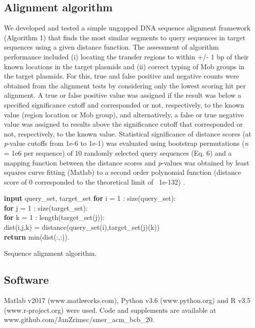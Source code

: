 \documentclass[sigconf]{acmart}
\begin{document}
\subsection{Alignment algorithm}
We developed and tested a simple ungapped DNA sequence alignment framework (Algorithm 1) that finds the most similar segments to query sequences in target sequences using a given distance function. The assessment of algorithm performance included (i) locating the transfer regions to within +/- 1 bp of their known locations in the target plasmids and (ii) correct typing of Mob groups in the target plasmids. For this, true and false positive and negative counts were obtained from the alignment tests by considering only the lowest scoring hit per alignment. A true or false positive value was assigned if the result was below a specified significance cutoff and corresponded or not, respectively, to the known value (region location or Mob group), and alternatively, a false or true negative value was assigned to results above the significance cutoff that corresponded or not, respectively, to the known value. Statistical significance of distance scores (at \textit{p}-value cutoffs from 1e-6 to 1e-1) was evaluated using bootstrap permutations (\textit{n} = 1e6 per sequence) of 10 randomly selected query sequences (Eq. 6) and a mapping function between the distance scores and \textit{p}-values was obtained by least squares curve fitting (Matlab) to a second order polynomial function (distance score of 0 corresponded to the theoretical limit of ~1e-132) \cite{Zrimec2020-wx}. 

\begin{algorithm}
\SetAlgoLined
 \textbf{input} query\_set, target\_set\;
 \textbf{for} i = 1 : size(query\_set):\\
 \enskip \textbf{for} j = 1 : size(target\_set):\\
 \quad \textbf{for} k = 1 : length(target\_set(j)):\\
 \qquad dist(i,j,k) = distance(query\_set(i),target\_set(j)(k))\;\\
 \textbf{return} min(dist(:,:)).
 \caption{Sequence alignment algorithm.}
\end{algorithm}

\subsection{Software}
Matlab v2017 (www.mathworks.com), Python v3.6 (www.python.org) and R v3.5 (www.r-project.org) were used. Code and supplements are available at www.github.com/JanZrimec/smer\_acm\_bcb\_20.
\end{document}
